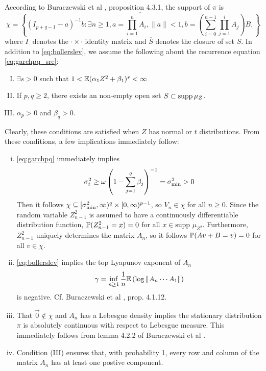 \documentclass[aoas,preprint]{imsart}
\numberwithin{equation}{section}
\theoremstyle{plain}
\begin{document}
According to Buraczewski et al 
\cite{buraczewski:damek:mikosch:2016}, proposition 4.3.1, the support
of $\pi$ is
\[
\chi = \overline{
  \left\{
  (I_{p+q-1} - a)^{-1} b:
  \exists n \geq 1,
  a = \prod_{i=1}^n A_i,
  \|a\| < 1,
  b = \left(\sum_{i=0}^{n-1} \prod_{j=1}^i A_{j}\right) B,
  \right\}
}
\]
where $I_{\cdot}$ denotes the $\cdot \times \cdot$ identity matrix and
$\overline S$ denotes the closure of set $S$.
In addition to \eqref{eq:bollerslev}, we assume the following about
the recurrence equation \eqref{eq:garchpq_sre}:
\begin{enumerate}[(I)]
\item $\exists s > 0$ such that
  $1 < \E (\alpha_1 Z^2 + \beta_1)^s < \infty$
\item If $p, q \geq 2$, there exists an non-empty open set
  $S \subset \supp \mu_Z$.
\item $\alpha_p > 0$  and $\beta_q > 0$.
\end{enumerate}
Clearly, these conditions are satisfied when $Z$ has normal or $t$
distributions. From these conditions, a few implications immediately follow:
\begin{enumerate}[(i)]
\item \eqref{eq:garchpq} immediately implies
  \[
  \sigma_t^2 \geq \omega \left(
    1 - \sum_{j=1}^q \beta_j
  \right)^{-1} = \sigma_{\m}^2 > 0
  \]
  Then it follows
  $\chi \subseteq [\sigma_{\m}^2, \infty)^q \times [0, \infty)^{p-1}$, so
  $V_n \in \chi$ for all $n \geq 0$. Since the random variable
  $Z_{n-1}^2$ is assumed to have a continuously differentiable
  distribution function,
  $\P(Z_{n-1}^2 = x) = 0$ for all $x \in \text{supp } \mu_{Z^2}$.
  Furthermore, $Z_{n-1}^2$ uniquely determines the matrix $A_n$,
  so it follows $\P(A v + B = v) = 0$ for all $v \in \chi$.

\item \eqref{eq:bollerslev} implies the top Lyapunov exponent of $A_n$
  \begin{equation}
    \label{eq:Lyapunov}
    \gamma = \inf_{n \geq 1} {1 \over n}
    \E \left(\log \| A_n \cdots A_1 \| \right)    
  \end{equation}
  is negative. Cf. Buraczewski et al
  \cite{buraczewski:damek:mikosch:2016}, prop. 4.1.12.

\item That $\vec 0 \notin \chi$ and $A_n$ has a Lebesgue density
  implies the stationary distribution $\pi$ is absolutely continuous with
  respect to Lebesgue measure. This immediately follows from lemma
  4.2.2 of Buraczewski et al \cite{buraczewski:damek:mikosch:2016}.

\item Condition (III) ensures that, with probability 1, every row and
  column of the matrix $A_n$ has at least one postive component.

\end{enumerate}
\end{document}
